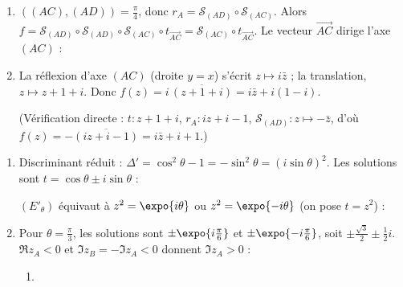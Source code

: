 \begin{description}
\begin{enumerate}
\begin{enumerate}
			\item {}
				$\left((AC),(AD)\right) = \frac{\pi}{4}$, donc $r_A = \mathscr{S}_{(AD)} \circ \mathscr{S}_{(AC)}$. Alors
				$f = \mathscr{S}_{(AD)} \circ \mathscr{S}_{(AD)} \circ \mathscr{S}_{(AC)} \circ t_{\overrightarrow{AC}} = \mathscr{S}_{(AC)} \circ t_{\overrightarrow{AC}}$.
				Le vecteur $\overrightarrow{AC}$ dirige l'axe $(AC)$ :
				\par\noindent{}
			\item {}
				La réflexion d'axe $(AC)$ (droite $y = x$) s'écrit $z \mapsto i\bar{z}$ ; la translation, $z \mapsto z + 1 + i$. Donc
				$f(z) = i\,\overline{(z + 1 + i)} = i\bar{z} + i(1 - i)$.
				\par\noindent{}
				(Vérification directe : $t : z + 1 + i$, $r_A : iz + i - 1$, $\mathscr{S}_{(AD)} : z \mapsto -\bar{z}$, d'où $f(z) = -\overline{(iz + i - 1)} = i\bar{z} + i + 1$.)
		\end{enumerate}
	\end{enumerate}
	\item[Partie B]
	\begin{enumerate}
		\item {}
			Discriminant réduit : $\Delta' = \cos^2\theta - 1 = -\sin^2\theta = (i\sin\theta)^2$. Les solutions sont $t = \cos\theta \pm i\sin\theta$ :
			\par\noindent{}
			$(E'_\theta)$ équivaut à $z^2 = \expo{i\theta}$ ou $z^2 = \expo{-i\theta}$ (on pose $t = z^2$) :
			\par\noindent{}
		\item Pour $\theta = \frac{\pi}{3}$, les solutions sont $\pm\expo{i\frac{\pi}{6}}$ et $\pm\expo{-i\frac{\pi}{6}}$, soit $\pm\frac{\sqrt{3}}{2} \pm \frac{1}{2}i$.
			$\Re{z_A} < 0$ et $\Im{z_B} = -\Im{z_A} < 0$ donnent $\Im{z_A} > 0$ :
			\par\noindent{}
		\begin{enumerate}
			\item {}

\end{enumerate}
\end{enumerate}
\end{description}
